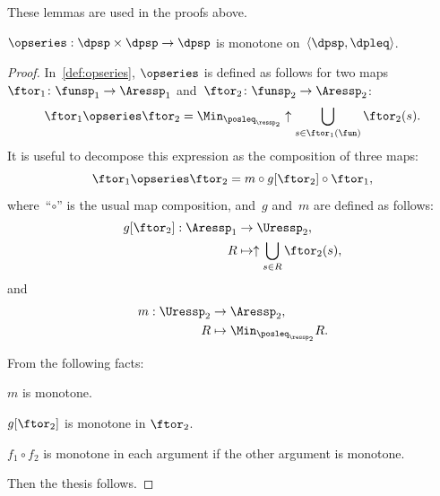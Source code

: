 These lemmas are used in the proofs above.
\begin{lemma}
    \label{lem:series-monotone}$\opseries:\dpsp\times\dpsp\rightarrow\dpsp$
    is monotone on~$\langle\dpsp,\dpleq\rangle$.
\end{lemma}
\begin{proof}
    In~\cref{def:opseries}, $\opseries$ is defined as follows
    for two maps~$\ftor_{1}\colon\funsp_{1}\rightarrow\Aressp_{1}$ and~$\ftor_{2}\colon\funsp_{2}\rightarrow\Aressp_{2}$:
    \[
            {\displaystyle \ftor_{1}\opseries\ftor_{2}=\Min_{\posleq_{\ressp_{2}}}\uparrow\bigcup_{s\in\ftor_{1}(\fun)}\ftor_{2}(s)}.
    \]
    It is useful to decompose this expression as the composition of three
    maps:
    \[
        \ftor_{1}\opseries\ftor_{2}=m\circ g[\ftor_{2}]\circ\ftor_{1},
    \]
    where~``$\circ$'' is the usual map composition, and~$g$ and~$m$
    are defined as follows:
    \begin{align*}
        g[\ftor_{2}]:\Aressp_{1} & \rightarrow\Uressp_{2},\\
        R & \mapsto\uparrow\bigcup_{s\in R}\ftor_{2}(s),
    \end{align*}
    and
    \begin{align*}
        m:\Uressp_{2} & \to \Aressp_{2},\\
        R & \mapsto\Min_{\posleq_{\ressp_{2}}}R.
    \end{align*}

    From the following facts:
    \begin{compactitem}
        \item $m$ is monotone.
        \item $g[\ftor_{2}]$ is monotone in $\ftor_{2}$.
        \item $f_{1}\circ f_{2}$ is monotone in each argument if the other argument
        is monotone.
    \end{compactitem}
    Then the thesis follows.
\end{proof}

